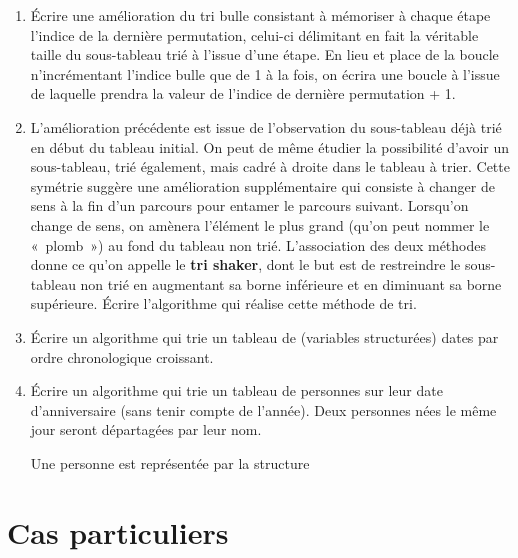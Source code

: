 	\liststyleExercice
	\setcounter{saveenum}{\value{enumi}}
	\begin{enumerate}
	\setcounter{enumi}{\value{saveenum}}
		\item 
			Écrire une amélioration du tri bulle consistant à mémoriser à chaque
			étape l’indice de la dernière permutation, celui-ci délimitant en fait
			la véritable taille du sous-tableau trié à l’issue d’une étape. En lieu
			et place de la boucle  n’incrémentant l’indice
			bulle que de 1 à la fois, on écrira une boucle  à l’issue de laquelle  prendra la
			valeur de l’indice de dernière permutation + 1.
		\item 
			L’amélioration précédente est issue de l’observation du sous-tableau
			déjà trié en début du tableau initial. On peut de même étudier la
			possibilité d’avoir un sous-tableau, trié également, mais cadré à
			droite dans le tableau à trier. Cette symétrie suggère une amélioration
			supplémentaire qui consiste à changer de sens à la fin d’un parcours
			pour entamer le parcours suivant. Lorsqu’on change de sens, on amènera
			l’élément le plus grand (qu’on peut nommer le «~plomb~») au fond du
			tableau non trié. L’association des deux méthodes donne ce qu’on
			appelle le \textbf{tri shaker}, dont le but est de restreindre le
			sous-tableau non trié en augmentant sa borne inférieure et en diminuant
			sa borne supérieure. Écrire l’algorithme qui réalise cette méthode de
			tri.
		\item 
			Écrire un algorithme qui trie un tableau de (variables structurées)
			dates par ordre chronologique croissant.
		\item 
			Écrire un algorithme qui trie un tableau de personnes sur leur date
			d'anniversaire (sans tenir compte de
			l'année). Deux personnes nées le même jour seront
			départagées par leur nom.

			Une personne est représentée par la structure 
			
			\bigskip
			
			
		\end{enumerate}
		
		\bigskip


\section{Cas particuliers}

